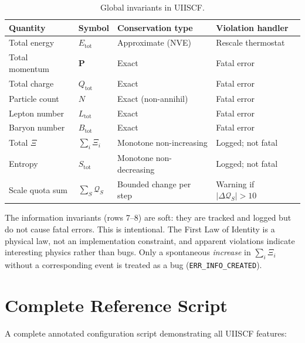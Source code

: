 \documentclass[11pt,a4paper]{article}
\newcommand{\Rec}{\Xi}
\newcommand{\Quota}{\mathcal{Q}}
\begin{document}
\begin{table}[H]
\centering
\caption{Global invariants in UIISCF.}
\label{tab:invariants}
\begin{tabular}{@{}lllp{5.5cm}@{}}
\toprule
Quantity & Symbol & Conservation type & Violation handler \\
\midrule
Total energy       & $E_{\mathrm{tot}}$ & Approximate (NVE) & Rescale thermostat \\
Total momentum     & $\mathbf{P}$       & Exact             & Fatal error \\
Total charge       & $Q_{\mathrm{tot}}$ & Exact             & Fatal error \\
Particle count     & $N$                & Exact (non-annihil)& Fatal error \\
Lepton number      & $L_{\mathrm{tot}}$ & Exact             & Fatal error \\
Baryon number      & $B_{\mathrm{tot}}$ & Exact             & Fatal error \\
Total $\Rec$       & $\sum_i \Rec_i$    & Monotone non-increasing & Logged; not fatal \\
Entropy            & $S_{\mathrm{tot}}$ & Monotone non-decreasing & Logged; not fatal \\
Scale quota sum    & $\sum_S \Quota_S$  & Bounded change per step & Warning if $|\Delta\Quota_S| > 10$ \\
\bottomrule
\end{tabular}
\end{table}

\noindent
The information invariants (rows 7--8) are soft: they are tracked and logged
but do not cause fatal errors.  This is intentional.  The First Law of
Identity is a physical law, not an implementation constraint, and apparent
violations indicate interesting physics rather than bugs.  Only a spontaneous
\emph{increase} in $\sum_i \Rec_i$ without a corresponding event is treated
as a bug (\texttt{ERR\_INFO\_CREATED}).

\section{Complete Reference Script}\label{sec:refblock}

A complete annotated configuration script demonstrating all UIISCF features:
\end{document}
